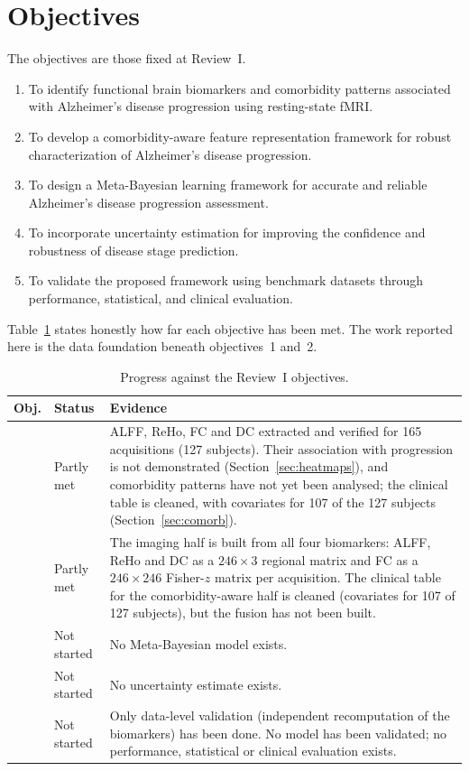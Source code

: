 \documentclass{ssnreview}
\begin{document}
\section{Objectives}
The objectives are those fixed at Review~I.
\begin{enumerate}[label=\arabic*.]
  \item To identify functional brain biomarkers and comorbidity patterns associated
        with Alzheimer's disease progression using resting-state fMRI.
  \item To develop a comorbidity-aware feature representation framework for robust
        characterization of Alzheimer's disease progression.
  \item To design a Meta-Bayesian learning framework for accurate and reliable
        Alzheimer's disease progression assessment.
  \item To incorporate uncertainty estimation for improving the confidence and
        robustness of disease stage prediction.
  \item To validate the proposed framework using benchmark datasets through
        performance, statistical, and clinical evaluation.
\end{enumerate}

Table~\ref{tab:objstatus} states honestly how far each objective has been met. The
work reported here is the data foundation beneath objectives~1 and~2.

\begin{table}[!htbp]
\centering
\caption{Progress against the Review~I objectives.}
\label{tab:objstatus}
\small
\begin{tabularx}{\textwidth}{@{}>{\centering\arraybackslash}p{0.8cm}>{\raggedright\arraybackslash}p{2.6cm}X@{}}
\toprule
\textbf{Obj.} & \textbf{Status} & \textbf{Evidence} \\
\midrule
1 & Partly met & ALFF, ReHo, FC and DC extracted and verified for 165 acquisitions
(127 subjects). Their association with progression is not demonstrated
(Section~\ref{sec:heatmaps}), and comorbidity patterns have not yet been analysed; the
clinical table is cleaned, with covariates for 107 of the 127 subjects (Section~\ref{sec:comorb}). \\
2 & Partly met & The imaging half is built from all four biomarkers: ALFF, ReHo and DC
as a $246\times3$ regional matrix and FC as a $246\times246$ Fisher-$z$ matrix per
acquisition. The clinical table for the comorbidity-aware half is cleaned (covariates for 107 of 127 subjects), but the fusion has not been built. \\
3 & Not started & No Meta-Bayesian model exists. \\
4 & Not started & No uncertainty estimate exists. \\
5 & Not started & Only data-level validation (independent recomputation of the
biomarkers) has been done. No model has been validated; no performance, statistical or
clinical evaluation exists. \\
\bottomrule
\end{tabularx}
\end{table}
\end{document}
